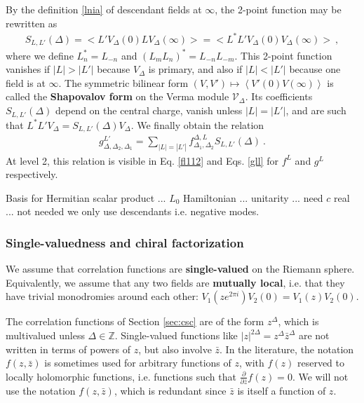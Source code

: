 \documentclass[12pt, a4paper]{article}
\newcommand{\myindex}[1]{\textbf{\boldmath #1}}
\theoremstyle{break}
\begin{document}
By the definition \eqref{lnia} of descendant fields at $\infty$, the 2-point function may be rewritten as 
\begin{align}
 S_{L,L'}(\Delta)  = \Big<L'V_\Delta(0) LV_\Delta(\infty) \Big> =  \Big<L^*L'V_\Delta(0) V_\Delta(\infty) \Big> \ , 
 \end{align}
where we define $L^*_n = L_{-n}$ and $\left(L_mL_n\right)^* = L_{-n}L_{-m}$. This 2-point function vanishes if $|L|>|L'|$ because $V_\Delta$ is primary, and also if $|L|<|L'|$ because one field is at $\infty$. The symmetric bilinear form $(V,V')\mapsto \left<V'(0)V(\infty)\right>$ is called the \myindex{Shapovalov form} on the Verma module $\mathcal{V}_\Delta$. Its  coefficients $S_{L,L'}(\Delta)$ depend on the central charge, vanish unless $|L|=|L'|$, and are such that $L^*L'V_\Delta = S_{L,L'}(\Delta) V_\Delta$. We finally obtain the relation 
\begin{align}
 g^{L'}_{\Delta,\Delta_2,\Delta_1}= \sum_{|L|=|L'|} f^{\Delta,L}_{\Delta_1,\Delta_2}S_{L,L'}(\Delta)\ . 
 \label{gfs}
\end{align}
At level 2, this relation is visible in Eq. \eqref{fl112} and Eqs. \eqref{gll} for $f^L$ and $g^L$ respectively. 


Basis for Hermitian scalar product ... $L_0$ Hamiltonian ... unitarity ... need $c$ real ... not needed we only use descendants i.e. negative modes. 



\subsubsection{Single-valuedness and chiral factorization}

We assume that correlation functions are \myindex{single-valued} on the Riemann sphere. Equivalently, we assume that any two fields are \myindex{mutually local}, i.e. that they have trivial monodromies around each other: $V_1(ze^{2\pi i})V_2(0)=V_1(z)V_2(0)$. 

The correlation functions of Section \ref{sec:csc} are of the form $z^\Delta$, which is multivalued unless $\Delta\in\mathbb{Z}$. Single-valued functions like $|z|^{2\Delta}=z^\Delta\bar{z}^\Delta$ are not written in terms of powers of $z$, but also involve $\bar z$. In the literature, the notation $f(z,\bar z)$ is sometimes used for arbitrary functions of $z$, with $f(z)$ reserved to locally holomorphic functions, i.e. functions such that $\frac{\partial}{\partial \bar z} f(z) =0$. We will not use the notation $f(z,\bar z)$, which is redundant since $\bar z$ is itself a function of $z$. 
\end{document}
